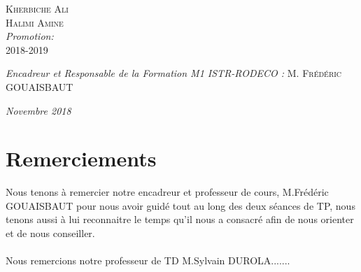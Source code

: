 \documentclass[12pt, a4paper, openany]{report}
\begin{document}
\begin{titlepage}
\begin{sffamily}
\begin{center}
    \begin{minipage}{0.4\textwidth}
      \begin{flushleft} \large
         \textsc{Kherbiche Ali}\\
         \textsc{Halimi Amine}\\
        \emph {Promotion:} \\
         \textsc{2018-2019}\\
      \end{flushleft}
    \end{minipage}
    \begin{minipage}{0.4\textwidth}
      \begin{flushright} \large
        \emph{Encadreur et Responsable de la Formation M1 ISTR-RODECO :}  \textsc{M. Frédéric GOUAISBAUT}\\
      \end{flushright}
    \end{minipage}

    \vfill

    \emph{\large Novembre 2018}

  \end{center}
  \end{sffamily}      
          
  \end{titlepage}
  
\makeatother



\chapter*{Remerciements}
  
   Nous tenons à remercier notre encadreur et professeur de cours, M.Frédéric GOUAISBAUT pour nous avoir guidé tout au long des deux séances de TP, nous tenons aussi à lui reconnaitre le temps qu'il nous a consacré afin de nous orienter et de nous conseiller.\\
   \\
   Nous remercions notre professeur de TD M.Sylvain DUROLA.......     
   
\tableofcontents
\listoffigures
\listoftables
\end{document}
